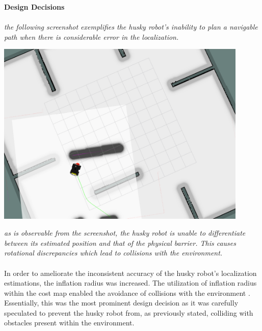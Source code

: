 \documentclass[12pt]{article}
\begin{document}
{\setlength{\parindent}{0cm}
\textbf{Design Decisions} 
\\\\ \textit{the following screenshot exemplifies the husky robot's inability to plan a navigable path when there is considerable error in the localization.} 
\begin{center} \includegraphics[width=120mm]{RViz1.png} \end{center}
\textit{as is observable from the screenshot, the husky robot is unable to differentiate between its estimated position and that of the physical barrier. This causes rotational discrepancies which lead to collisions with the environment.}
\paragraph{} In order to ameliorate the inconsistent accuracy of the husky robot's localization estimations, the inflation radius was increased. 
  The utilization of inflation radius within the cost map enabled the avoidance of collisions with the environment . Essentially, this was the most prominent design decision as it was carefully speculated to prevent the husky robot from, as previously stated, colliding with obstacles present within the environment.   
\\\\\\\\\\  
}
\end{document}
